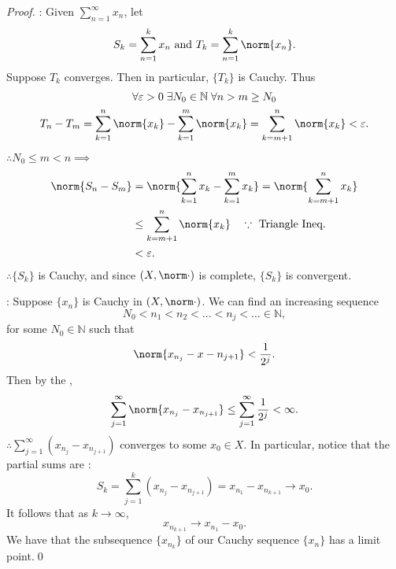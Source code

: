 \documentclass[notoc,notitlepage]{tufte-book}
\begin{document}
\begin{proof}
  : Given $\sum_{n=1}^{\infty} x_n$, let
  \begin{equation*}
    S_k = \sum_{n=1}^{k} x_n \text{ and } T_k = \sum_{n=1}^{k} \norm{ x_n }.
  \end{equation*}
  Suppose $T_k$ converges. Then in particular, $\{ T_k \}$ is Cauchy. Thus
  \begin{gather*}
    \forall \epsilon > 0 \; \exists N_0 \in \mathbb{N} \; \forall n > m \geq N_0 \\
    T_n - T_m = \sum_{k=1}^{n} \norm{ x_k } - \sum_{k=1}^{m} \norm{ x_k } = \sum_{k = m + 1}^{n} \norm{ x_k } < \epsilon.
  \end{gather*}
  $\therefore N_0 \leq m < n \implies$
  \begin{align*}
    \norm{ S_n - S_m } &= \norm{ \sum_{k=1}^{n} x_k - \sum_{k=1}^{m} x_k } = \norm{ \sum_{k=m + 1}^{n} x_k } \\
                       &\leq \sum_{k=m + 1}^{n} \norm{ x_k } \quad \because \text{ Triangle Ineq. } \\
                       &< \epsilon.
  \end{align*}
  $\therefore \{ S_k \}$ is Cauchy, and since $(X, \norm\cdot)$ is complete, $\{ S_k \}$ is convergent.

  \noindent
  : Suppose $\{ x_n \}$ is Cauchy in $(X, \norm\cdot)$. We can find an increasing sequence
  \begin{equation*}
    N_0 < n_1 < n_2 < \hdots < n_j < \hdots \in \mathbb{N},
  \end{equation*}
  for some $N_0 \in \mathbb{N}$ such that
  \begin{equation*}
    \norm{ x_{n_j} - x-{n_{ j + 1 }} } < \frac{1}{2^j}.
  \end{equation*}
  Then by the ,
  \begin{equation*}
    \sum_{j=1}^{\infty} \norm{ x_{n_j} - x_{n_{j + 1}} } \leq \sum_{j=1}^{\infty} \frac{1}{2^j} < \infty.
  \end{equation*}
  $\therefore \sum\limits_{j=1}^{\infty} ( x_{n_j} - x_{n_{j + 1}} )$ converges to some $x_0 \in X$. In particular, notice that the partial sums are :
  \begin{equation*}
    S_k = \sum_{j=1}^{k} \left( x_{n_j} - x_{n_{j + 1}} \right) = x_{n_1} - x_{n_{k + 1}} \to x_0.
  \end{equation*}
  It follows that as $k \to \infty$,
  \begin{equation*}
    x_{n_{k + 1}} \to x_{n_1} - x_0.
  \end{equation*}
  We have that the subsequence $\{ x_{n_k} \}$ of our Cauchy sequence $\{ x_n \}$ has a limit point.\qed\
\end{proof}
\end{document}
